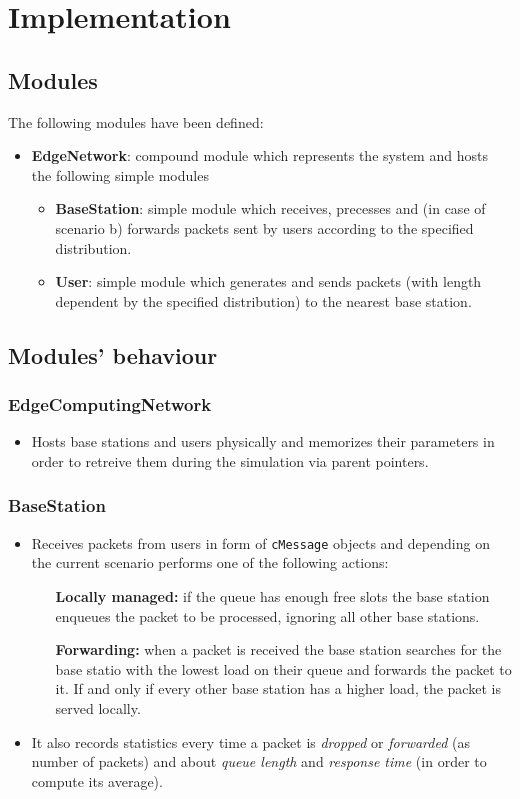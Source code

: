 \documentclass{article}
\begin{document}
\section{Implementation}
\subsection{Modules}
The following modules have been defined:
\begin{itemize}
    \item \textbf{EdgeNetwork}: compound module which represents the system and hosts the following simple modules
    \begin{itemize}
        \item \textbf{BaseStation}: simple module which receives, precesses and (in case of scenario b) forwards packets sent by users according to the specified distribution. 
        \item \textbf{User}: simple module which generates and sends packets (with length dependent by the specified distribution) to the nearest base station.
    \end{itemize}    
\end{itemize}

\subsection{Modules' behaviour}
\subsubsection{EdgeComputingNetwork}
\begin{itemize}
    \item Hosts base stations and users physically and memorizes their parameters in order to retreive them during the simulation via parent pointers.
\end{itemize}
\subsubsection{BaseStation}
\begin{itemize}
    \item Receives packets from users in form of \texttt{cMessage} objects and depending on the current scenario performs one of the following actions:
    \begin{itemize}
        \item [\textbf{Locally managed:}] if the queue has enough free slots the base station enqueues the packet to be processed, ignoring all other base stations.
        \item [\textbf{Forwarding:}] when a packet is received the base station searches for the base statio with the lowest load on their queue and forwards the packet to it. If and only if every other base station has a higher load, the packet is served locally.
    \end{itemize}
    \item It also records statistics every time a packet is \textit{dropped} or \textit{forwarded} (as number of packets) and about \textit{queue length} and \textit{response time} (in order to compute its average).
\end{itemize}
\end{document}
